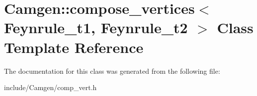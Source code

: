 \hypertarget{a00099}{\section{Camgen\-:\-:compose\-\_\-vertices$<$ Feynrule\-\_\-t1, Feynrule\-\_\-t2 $>$ Class Template Reference}
\label{a00099}
}


The documentation for this class was generated from the following file\-:\begin{DoxyCompactItemize}
\item 
include/\-Camgen/comp\-\_\-vert.\-h\end{DoxyCompactItemize}
